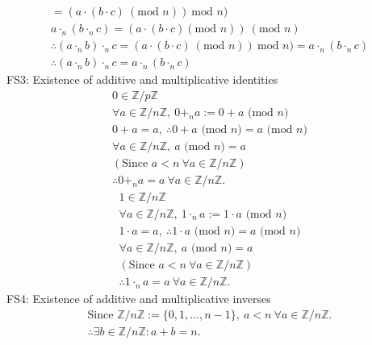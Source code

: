 \documentclass{article}
\begin{document}
\begin{enumerate}
\begin{enumerate}
\begin{gather*}
            = (a \cdot (b\cdot c) \  (\textrm{mod } n)) \ \textrm{mod } n) \\
            a \cdot_n (b \cdot_n c) = (a \cdot (b \cdot c) (\textrm{mod } n))\  (\textrm{mod } n) \\
            \therefore (a \cdot_n b) \cdot_n c = (a \cdot (b\cdot c) \  (\textrm{mod } n)) \ \textrm{mod } n) = a \cdot_n (b\cdot_n c) \\
            \therefore (a \cdot_n b) \cdot_n c = a \cdot_n (b\cdot_n c)
        \end{gather*}
        FS3: Existence of additive and multiplicative identities
        \begin{gather*}
            0 \in \mathbb{Z}/p\mathbb{Z} \\
            \forall a \in \mathbb{Z}/n\mathbb{Z}, \ 0 +_n a := 0 + a \textrm{ (mod } n) \\
            0 + a = a, \ \therefore  0 + a \textrm{ (mod } n) = a \textrm{ (mod } n) \\
            \forall a \in \mathbb{Z}/n\mathbb{Z}, \ a \textrm{ (mod } n) = a \\
            (\textrm{Since } a < n \ \forall a \in \mathbb{Z}/n\mathbb{Z}) \\
            \therefore  0 +_n a = a \ \forall a \in \mathbb{Z}/n\mathbb{Z}.
        \end{gather*}
        \begin{gather*}
            1 \in \mathbb{Z}/n\mathbb{Z} \\
            \forall a \in \mathbb{Z}/n\mathbb{Z}, \ 1 \cdot_n a := 1 \cdot a \textrm{ (mod } n) \\
            1 \cdot a = a, \ \therefore  1 \cdot a \textrm{ (mod } n) = a \textrm{ (mod } n) \\
            \forall a \in \mathbb{Z}/n\mathbb{Z}, \ a \textrm{ (mod } n) = a \\
            (\textrm{Since } a < n \ \forall a \in \mathbb{Z}/n\mathbb{Z}) \\
            \therefore  1 \cdot_n a = a \ \forall a \in \mathbb{Z}/n\mathbb{Z}.
        \end{gather*}
        FS4: Existence of additive and multiplicative inverses
        \begin{gather*}
            \textrm{Since } \mathbb{Z}/n\mathbb{Z}:=\{0,1,...,n-1\}, \ a < n \  \forall a \in \mathbb{Z}/n\mathbb{Z}. \\
            \therefore  \exists b \in \mathbb{Z}/n\mathbb{Z} : a + b = n. \\

\end{gather*}
\end{enumerate}
\end{enumerate}
\end{document}
